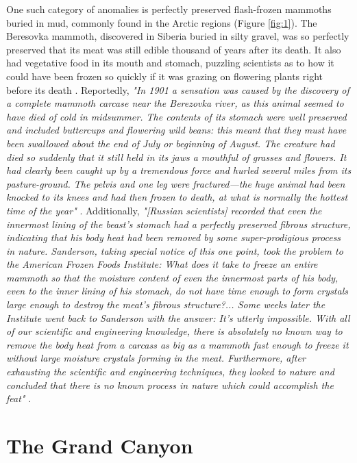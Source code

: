 \documentclass[10pt,twocolumn,letterpaper]{article}
\begin{document}
One such category of anomalies is perfectly preserved flash-frozen mammoths buried in mud, commonly found in the Arctic regions (Figure \ref{fig:1}). The Beresovka mammoth, discovered in Siberia buried in silty gravel, was so perfectly preserved that its meat was still edible thousand of years after its death. It also had vegetative food in its mouth and stomach, puzzling scientists as to how it could have been frozen so quickly if it was grazing on flowering plants right before its death \cite{17}. Reportedly, \textit{"In 1901 a sensation was caused by the discovery of a complete mammoth carcase near the Berezovka river, as this animal seemed to have died of cold in midsummer. The contents of its stomach were well preserved and included buttercups and flowering wild beans: this meant that they must have been swallowed about the end of July or beginning of August. The creature had died so suddenly that it still held in its jaws a mouthful of grasses and flowers. It had clearly been caught up by a tremendous force and hurled several miles from its pasture-ground. The pelvis and one leg were fractured—the huge animal had been knocked to its knees and had then frozen to death, at what is normally the hottest time of the year"} \cite{18}. Additionally, \textit{"[Russian scientists] recorded that even the innermost lining of the beast’s stomach had a perfectly preserved fibrous structure, indicating that his body heat had been removed by some super-prodigious process in nature. Sanderson, taking special notice of this one point, took the problem to the American Frozen Foods Institute: What does it take to freeze an entire mammoth so that the moisture content of even the innermost parts of his body, even to the inner lining of his stomach, do not have time enough to form crystals large enough to destroy the meat’s fibrous structure?... Some weeks later the Institute went back to Sanderson with the answer: It’s utterly impossible. With all of our scientific and engineering knowledge, there is absolutely no known way to remove the body heat from a carcass as big as a mammoth fast enough to freeze it without large moisture crystals forming in the meat. Furthermore, after exhausting the scientific and engineering techniques, they looked to nature and concluded that there is no known process in nature which could accomplish the feat"} \cite{19}.

\section{The Grand Canyon}
\end{document}
